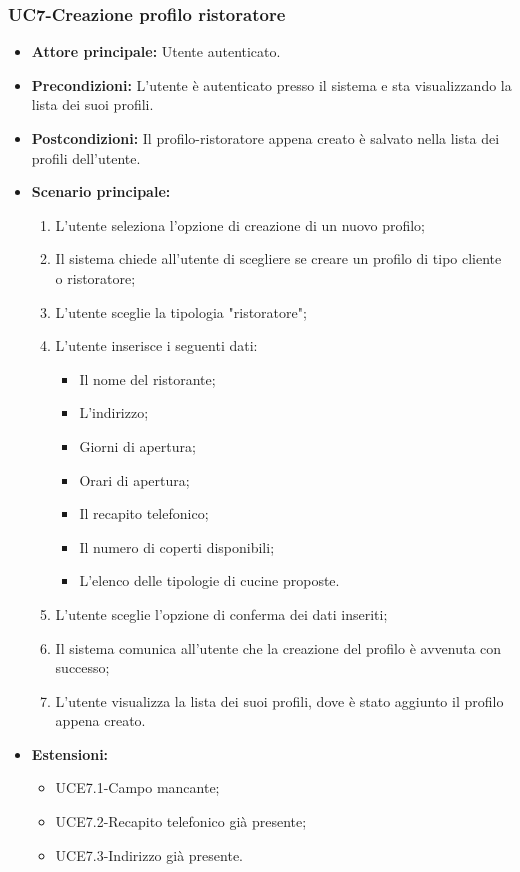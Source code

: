 \subsubsection{UC7-Creazione profilo ristoratore}
\begin{itemize}
    \item \textbf{Attore principale:} Utente autenticato.
    \item \textbf{Precondizioni:} L'utente è autenticato presso il sistema e sta visualizzando la lista dei suoi profili.
    \item \textbf{Postcondizioni:} Il profilo-ristoratore appena creato è salvato nella lista dei profili dell'utente.
    \item \textbf{Scenario principale:}
    \begin{enumerate}
        \item L'utente seleziona l'opzione di creazione di un nuovo profilo;
        \item Il sistema chiede all'utente di scegliere se creare un profilo di tipo cliente
        o ristoratore;
        \item L'utente sceglie la tipologia "ristoratore";
        \item L'utente inserisce i seguenti dati:
        \begin{itemize}
            \item Il nome del ristorante;
            \item L'indirizzo;
            \item Giorni di apertura;
            \item Orari di apertura;
            \item Il recapito telefonico;
            \item Il numero di coperti disponibili;
            \item L'elenco delle tipologie di cucine proposte.
        \end{itemize}
        \item L'utente sceglie l'opzione di conferma dei dati inseriti;
        \item Il sistema comunica all'utente che la creazione del profilo è avvenuta con successo;
        \item L'utente visualizza la lista dei suoi profili, dove è stato aggiunto il profilo appena creato.
    \end{enumerate}
        \item \textbf{Estensioni:}
        \begin{itemize}
                \item UCE7.1-Campo mancante;
                \item UCE7.2-Recapito telefonico già presente;
                \item UCE7.3-Indirizzo già presente.
        \end{itemize}
\end{itemize}

